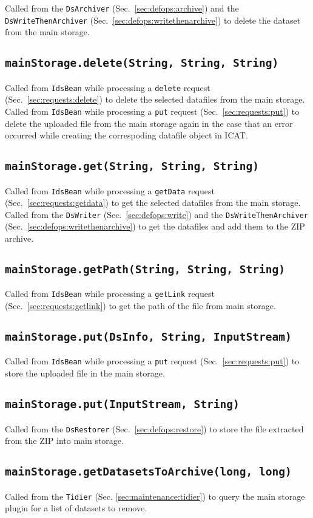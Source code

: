 \documentclass[paper=a4]{scrartcl}
\begin{document}
Called from the \texttt{DsArchiver} (Sec.\ \ref{sec:defops:archive})
and the \texttt{DsWriteThenArchiver}
(Sec.\ \ref{sec:defops:writethenarchive}) to delete the dataset from
the main storage.

\subsection{\texttt{mainStorage.delete(String, String, String)}}

Called from \texttt{IdsBean} while processing a \texttt{delete}
request (Sec.\ \ref{sec:requests:delete}) to delete the selected
datafiles from the main storage.  Called from \texttt{IdsBean} while
processing a \texttt{put} request (Sec.\ \ref{sec:requests:put}) to
delete the uploaded file from the main storage again in the case that
an error occurred while creating the correspoding datafile object in
ICAT.

\subsection{\texttt{mainStorage.get(String, String, String)}}

Called from \texttt{IdsBean} while processing a \texttt{getData}
request (Sec.\ \ref{sec:requests:getdata}) to get the selected
datafiles from the main storage.  Called from the \texttt{DsWriter}
(Sec.\ \ref{sec:defops:write}) and the \texttt{DsWrite\-Then\-Archiver}
(Sec.\ \ref{sec:defops:writethenarchive}) to get the datafiles and add
them to the ZIP archive.

\subsection{\texttt{mainStorage.getPath(String, String, String)}}

Called from \texttt{IdsBean} while processing a \texttt{getLink}
request (Sec.\ \ref{sec:requests:getlink}) to get the path of the file
from main storage.

\subsection{\texttt{mainStorage.put(DsInfo, String, InputStream)}}

Called from \texttt{IdsBean} while processing a \texttt{put} request
(Sec.\ \ref{sec:requests:put}) to store the uploaded file in the main
storage.

\subsection{\texttt{mainStorage.put(InputStream, String)}}

Called from the \texttt{DsRestorer} (Sec.\ \ref{sec:defops:restore})
to store the file extracted from the ZIP into main storage.

\subsection{\texttt{mainStorage.getDatasetsToArchive(long, long)}}

Called from the \texttt{Tidier} (Sec. \ref{sec:maintenance:tidier}) to
query the main storage plugin for a list of datasets to remove.
\end{document}
